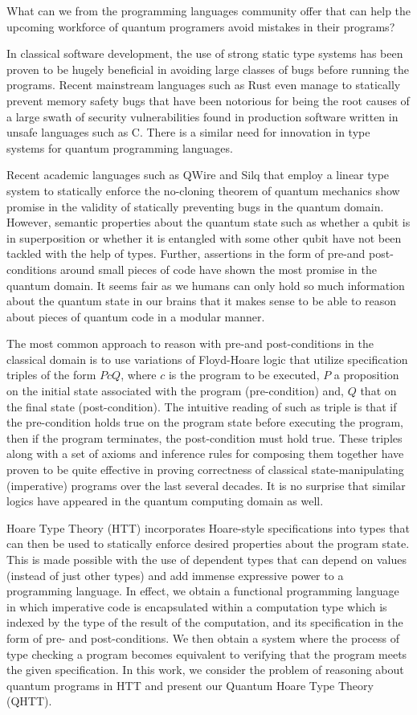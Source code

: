 \documentclass[adraft,creativecommons]{eptcs}
\begin{document}
What can we from the programming languages community offer that can help the upcoming workforce of quantum programers avoid mistakes in their programs?

In classical software development, the use of strong static type systems has been proven to be hugely beneficial in avoiding large classes of bugs before running the programs. Recent mainstream languages such as Rust even manage to statically prevent memory safety bugs that have been notorious for being the root causes of a large swath of security vulnerabilities found in production software written in unsafe languages such as C. There is a similar need for innovation in type systems for quantum programming languages.

Recent academic languages such as QWire and Silq that employ a linear type system to statically enforce the no-cloning theorem of quantum mechanics show promise in the validity of statically preventing bugs in the quantum domain. However, semantic properties about the quantum state such as whether a qubit is in superposition or whether it is entangled with some other qubit have not been tackled with the help of types. Further, assertions in the form of pre-and post-conditions around small pieces of code have shown the most promise in the quantum domain. It seems fair as we humans can only hold so much information about the quantum state in our brains that it makes sense to be able to reason about pieces of quantum code in a modular manner.

The most common approach to reason with pre-and post-conditions in the classical domain is to use variations of Floyd-Hoare logic that utilize specification triples of the form ${P} c {Q}$, where $c$ is the program to be executed, $P$ a proposition on the initial state associated with the program (pre-condition) and, $Q$ that on the final state (post-condition). The intuitive reading of such as triple is that if the pre-condition holds true on the program state before executing the program, then if the program terminates, the post-condition must hold true. These triples along with a set of axioms and inference rules for composing them together have proven to be quite effective in proving correctness of classical state-manipulating (imperative) programs over the last several decades. It is no surprise that similar logics have appeared in the quantum computing domain as well.

Hoare Type Theory (HTT) incorporates Hoare-style specifications into types that can then be used to statically enforce desired properties about the program state. This is made possible with the use of dependent types that can depend on values (instead of just other types) and add immense expressive power to a programming language. In effect, we obtain a functional programming language in which imperative code is encapsulated within a computation type which is indexed by the type of the result of the computation, and its specification in the form of pre- and post-conditions. We then obtain a system where the process of type checking a program becomes equivalent to verifying that the program meets the given specification. In this work, we consider the problem of reasoning about quantum programs in HTT and present our Quantum Hoare Type Theory (QHTT).
\end{document}
